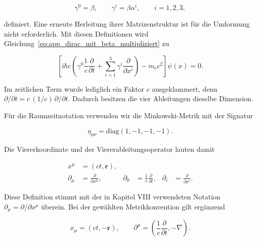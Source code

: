 \begin{equation}
	\gamma^0
	=
	\beta,
	\qquad
	\gamma^i
	=
	\beta\alpha^i,
	\qquad
	i=1,2,3,
	\label{eq:app_gamma_matrizen_definition}
\end{equation}

definiert. Eine erneute Herleitung ihrer Matrizenstruktur ist für die
Umformung nicht erforderlich. Mit diesen Definitionen wird
Gleichung~\eqref{eq:app_dirac_mit_beta_multipliziert} zu

\begin{equation}
	\left[
	\mathrm{i}\hbar c
	\left(
	\gamma^0\frac{1}{c}\frac{\partial}{\partial t}
	+
	\sum_{i=1}^{3}\gamma^i\frac{\partial}{\partial x^i}
	\right)
	-
	m_{\mathrm e}c^2
	\right]
	\psi(x)
	=
	0.
	\label{eq:app_dirac_gamma_ausgeschrieben}
\end{equation}

Im zeitlichen Term wurde lediglich ein Faktor \(c\) ausgeklammert, denn
\(\partial/\partial t=c\,(1/c)\,\partial/\partial t\). Dadurch besitzen
die vier Ableitungen dieselbe Dimension.

Für die Raumzeitnotation verwenden wir die
Minkowski-Metrik mit der Signatur

\begin{equation}
	\eta_{\mu\nu}
	=
	\mathrm{diag}(1,-1,-1,-1).
	\label{eq:app_minkowski_metrik_dirac}
\end{equation}

Die Viererkoordinate und der Viererableitungsoperator lauten damit

\begin{equation}
	\begin{aligned}
		x^\mu
		&=
		\left(ct,\mathbf r\right),
		\\
		\partial_\mu
		&=
		\frac{\partial}{\partial x^\mu},
		&
		\partial_0
		&=
		\frac{1}{c}\frac{\partial}{\partial t},
		&
		\partial_i
		&=
		\frac{\partial}{\partial x^i}.
	\end{aligned}
	\label{eq:app_viererkoordinate_ableitung_dirac}
\end{equation}

Diese Definition stimmt mit der in Kapitel VIII verwendeten Notation
\(\partial_\mu=\partial/\partial x^\mu\) überein. Bei der gewählten
Metrikkonvention gilt ergänzend

\begin{equation*}
	x_\mu
	=
	\left(ct,-\mathbf r\right),
	\qquad
	\partial^\mu
	=
	\left(
	\frac{1}{c}\frac{\partial}{\partial t},
	-\nabla
	\right).
\end{equation*}

